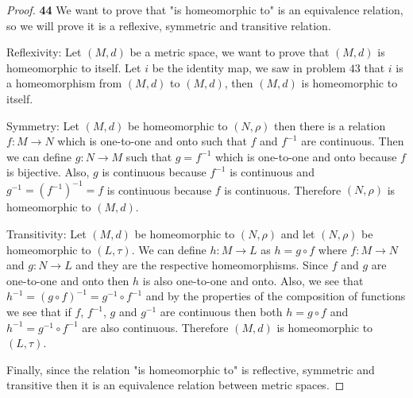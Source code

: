 \documentclass[11pt]{article}
\theoremstyle{definition}
\begin{document}
\cleardoublepage
    \begin{proof}{\textbf{44}}
        We want to prove that "is homeomorphic to" is an equivalence relation,
        so we will prove it is a reflexive, symmetric and transitive relation.
        
        Reflexivity: Let $(M,d)$ be a metric space, we want to prove that
        $(M,d)$ is homeomorphic to itself. Let $i$ be the identity map, we saw
        in problem $43$ that $i$ is a homeomorphism from $(M,d)$ to $(M,d)$,
        then $(M,d)$ is homeomorphic to itself.

        Symmetry: Let $(M,d)$ be homeomorphic to $(N,\rho)$ then there is a
        relation $f:M\to N$ which is one-to-one and onto such that 
        $f$ and $f^{-1}$ are continuous. Then we can define $g: N \to M$
        such that $g=f^{-1}$ which is one-to-one and onto because $f$ is
        bijective. Also, $g$ is continuous because $f^{-1}$ is continuous and
        $g^{-1} = (f^{-1})^{-1} = f$ is continuous because $f$ is continuous.
        Therefore $(N, \rho)$ is homeomorphic to $(M,d)$.
        
        Transitivity: Let $(M,d)$ be homeomorphic to $(N,\rho)$ and let
        $(N,\rho)$ be homeomorphic to $(L,\tau)$. We can define
        $h: M \to L$ as $h = g \circ f$ where $f:M \to N$ and $g:N\to L$
        and they are the respective homeomorphisms. Since $f$ and $g$ are
        one-to-one and onto then $h$ is also one-to-one and onto. Also, we see
        that $h^{-1} = (g \circ f)^{-1} = g^{-1} \circ f^{-1}$ and by the
        properties of the composition of functions we see that if $f$,
        $f^{-1}$, $g$ and $g^{-1}$ are continuous then both $h = g\circ f$ and
        $h^{-1} = g^{-1} \circ f^{-1}$ are also continuous. Therefore $(M,d)$
        is homeomorphic to $(L,\tau)$.

        Finally, since the relation "is homeomorphic to" is reflective,
        symmetric and transitive then it is an equivalence relation between
        metric spaces. 
    \end{proof}
\end{document}
